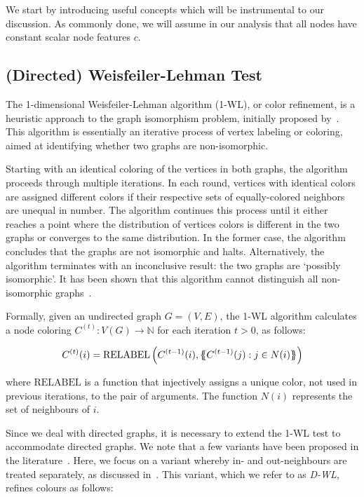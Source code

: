\documentclass{article}
\newcommand*{\ldblbrace}{\{\mskip-6mu\{}
\newcommand*{\rdblbrace}{\}\mskip-6mu\}}
\theoremstyle{plain}
\theoremstyle{definition}
\theoremstyle{remark}
\begin{document}
We start by introducing useful concepts which will be instrumental to our discussion. As commonly done, we will assume in our analysis that all nodes have constant scalar node features $c$. 

\subsection{(Directed) Weisfeiler-Lehman Test} \label{sec:appendix_wl}
The 1-dimensional Weisfeiler-Lehman algorithm (1-WL), or color refinement, is a heuristic approach to the graph isomorphism problem, initially proposed by~\citet{weisfeiler1968reduction}. This algorithm is essentially an iterative process of vertex labeling or coloring, aimed at identifying whether two graphs are non-isomorphic.

Starting with an identical coloring of the vertices in both graphs, the algorithm proceeds through multiple iterations. In each round, vertices with identical colors are assigned different colors if their respective sets of equally-colored neighbors are unequal in number. The algorithm continues this process until it either reaches a point where the distribution of vertices colors is different in the two graphs or converges to the same distribution. In the former case, the algorithm concludes that the graphs are not isomorphic and halts. Alternatively, the algorithm terminates with an inconclusive result: the two graphs are `possibly isomorphic'. It has been shown that this algorithm cannot distinguish all non-isomorphic graphs~\cite{cai1992anoptimal}. 

Formally, given an undirected graph $G = (V, E)$, the 1-WL algorithm calculates a node coloring $C^{(t)}: V (G) \rightarrow \mathbb{N}$ for each iteration $t > 0$, as follows:

\begin{equation}
C^{(t)}(i) = \mathrm{RELABEL}\left( C^{(t-1)}(i), \ldblbrace C^{(t-1)}(j) : j \in N(i) \rdblbrace\right)
\end{equation}

where $\mathrm{RELABEL}$ is a function that injectively assigns a unique color, not used in previous iterations, to the pair of arguments. The function $N(i)$ represents the set of neighbours of $i$.

Since we deal with directed graphs, it is necessary to extend the 1-WL test to accommodate directed graphs. We note that a few variants have been proposed in the literature~\cite{Grohe2021ColorRA,DBLP:journals/corr/abs-1904-08745,Kollias2022DirectedGA}. Here, we focus on a variant whereby in- and out-neighbours are treated separately, as discussed in~\citep{Grohe2021ColorRA}. This variant, which we refer to as \textit{D-WL}, refines colours as follows:
\end{document}
